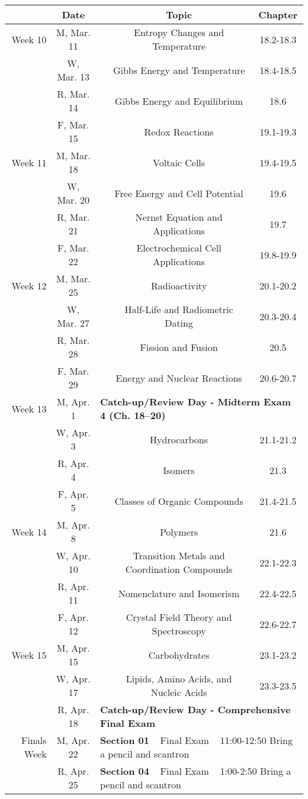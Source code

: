\documentclass[12pt, letterpaper]{article}
\begin{document}
\begin{tabular}{rcccc}
& Date && Topic & Chapter\\
\midrule
Week 10 & M, Mar. 11&& Entropy Changes and Temperature & 18.2-18.3\\
& W, Mar. 13&& Gibbs Energy and Temperature & 18.4-18.5\\
& R, Mar. 14&& Gibbs Energy and Equilibrium & 18.6\\
& F, Mar. 15&& Redox Reactions & 19.1-19.3\\
\midrule
Week 11 & M, Mar. 18&& Voltaic Cells & 19.4-19.5\\
& W, Mar. 20&& Free Energy and Cell Potential & 19.6\\
& R, Mar. 21&& Nernst Equation and Applications & 19.7\\
& F, Mar. 22&& Electrochemical Cell Applications & 19.8-19.9\\
\midrule
Week 12 & M, Mar. 25&& Radioactivity & 20.1-20.2\\
& W, Mar. 27&& Half-Life and Radiometric Dating & 20.3-20.4\\
& R, Mar. 28&& Fission and Fusion & 20.5\\
& F, Mar. 29&& Energy and Nuclear Reactions & 20.6-20.7\\
\midrule
Week 13 & M, Apr. 1& \multicolumn{3}{l}{\textbf{Catch-up/Review Day - Midterm Exam 4 (Ch. 18--20)}}\\
& W, Apr. 3&& Hydrocarbons & 21.1-21.2\\
& R, Apr. 4&& Isomers & 21.3\\
& F, Apr. 5&& Classes of Organic Compounds & 21.4-21.5\\
\midrule
Week 14 & M, Apr. 8&& Polymers & 21.6\\
& W, Apr. 10&& Transition Metals and Coordination Compounds & 22.1-22.3\\
& R, Apr. 11&& Nomenclature and Isomerism & 22.4-22.5\\
& F, Apr. 12&& Crystal Field Theory and Spectroscopy & 22.6-22.7\\
\midrule
Week 15 & M, Apr. 15&& Carbohydrates & 23.1-23.2\\
& W, Apr. 17&& Lipids, Amino Acids, and Nucleic Acids & 23.3-23.5\\
& R, Apr. 18& \multicolumn{3}{l}{\textbf{Catch-up/Review Day - Comprehensive Final Exam}}\\
\midrule
\midrule
Finals Week& M, Apr. 22& \multicolumn{3}{l}{\textbf{Section 01} ~ Final Exam ~ 11:00-12:50 Bring a pencil and scantron}\\
           & R, Apr. 25& \multicolumn{3}{l}{\textbf{Section 04} ~ Final Exam ~ 1:00-2:50 Bring a pencil and scantron}\\
\end{tabular}
\end{document}
